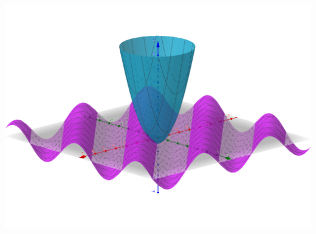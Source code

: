 \documentclass[cn,11pt, simple]{elegantbook}
\begin{document}
\centerline{\includegraphics[scale=0.5]{geogebra2.png}}






%	
%	
\end{document}
